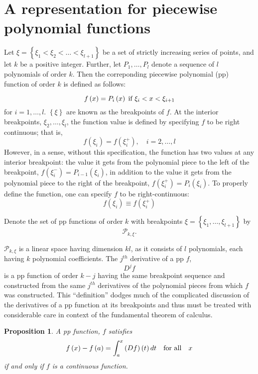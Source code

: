 \documentclass[12pt]{article}
\newtheorem{proposition}[theorem]{Proposition}
\theoremstyle{definition}
\begin{document}
\nocite{*}


\section{A representation for piecewise polynomial functions}

Let $\xi = \left\{ \xi_1<\xi_2<\dots<\xi_{l+1} \right\}$ be a set of strictly increasing series of points, and let $k$ be a positive integer. Further, let $P_1,\dots,P_l$ denote a sequence of $l$ polynomials of order $k$. Then the correponding piecewise polynomial (pp) function of order $k$ is defined as follows:

\[
f\left(x\right) = P_i\left(x\right) \; \textup{if } \xi_i < x < \xi_{i+1}
\] 
\noindent
for $i=1,\dots,l$. $\left\{\xi\right\}$ are known as the breakpoints of $f$. At the interior breakpoints, $\xi_2,\dots, \xi_l$, the function value is defined by specifying $f$ to be right continuous; that is, 
\[
f\left(\xi_i\right) = f\left(\xi_i^+\right),\quad i=2,\dots,l
\]
However, in a sense, without this specification, the function has two values at any interior breakpoint: the value it gets from the polynomial piece to the left of the breakpoint, $f\left(\xi_i^-\right) = P_{i-1}\left(\xi_i\right)$, in addition to the value it gets from the polynomial piece to the right of the breakpoint, $f\left(\xi_i^+\right) = P_{i}\left(\xi_i\right)$. To properly define the function, one can specify $f$ to be right-continuous:
\begin{equation}
f\left(\xi_i\right) \equiv f\left(\xi_i^+\right) 
\end{equation}

Denote the set of pp functions of order $k$ with breakpoints $\xi=\left\{\xi_1,\dots,\xi_{l+1}\right\}$ by 
\[
\mathcal{P}_{k,\xi}.
\]

$\mathcal{P}_{k,\xi}$ is a linear space having dimension $kl$, as it consists of $l$ polynomials, each having $k$ polynomial coefficients. The $j^{th}$ derivative of a pp $f$,
\[
D^jf
\]
\noindent
is a pp function of order $k-j$ having the same breakpoint sequence and constructed from the same $j^{th}$ derivatives of the polynomial pieces from which $f$ was constructed. This ``definition'' dodges much of the complicated discussion of the derivatives of a pp function at its breakpoints and thus must be treated with considerable care in context of the fundamental theorem of calculus.

\begin{proposition} \label{proposition:continuous_function}
A pp function, $f$ satisfies
\[
f\left(x\right) - f\left(a\right) = \int_a^x \left(Df\right)\left(t\right)dt\quad \textup{for all} \quad x
\]
if and only if $f$ is a continuous function.
\end{proposition}
\end{document}
